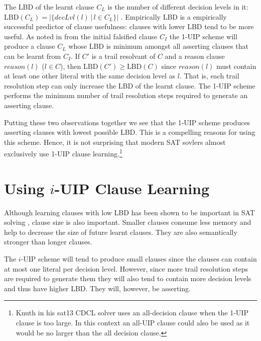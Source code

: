 \documentclass[runningheads]{llncs}
\newcommand{\sat}{SAT\xspace}
\newcommand{\LBD}{\text{LBD}}
\newcommand{\dlevel}[1]{\ensuremath{\mathit{decLvl}(#1)}}
\newcommand{\reason}[1]{\ensuremath{\mathit{reason}(#1)}}
\begin{document}
The LBD of the learnt clause $C_L$ is the number of different decision
levels in it:
$\LBD(C_L)=\left|\big\{\dlevel{l}\,|\,l \in C_L\big\}\right|$
\cite{DBLP:conf/ijcai/AudemardS09}. Empirically LBD is a empirically
successful predictor of clause usefulness: clauses with lower LBD tend
to be more useful. As noted in \cite{DBLP:conf/ijcai/AudemardS09} from
the initial falsified clause $C_I$ the 1-UIP scheme will produce a
clause $C_L$ whose LBD is minimum amongst all asserting clauses that
can be learnt from $C_I$. If $C'$ is a trail resolvant of $C$ and a
reason clause $\reason{l}$ ($l\in C$), then $\LBD(C') \geq \LBD(C)$
since $\reason{l}$ must contain at least one other literal with the
same decision level as $l$. That is, each trail resolution step can
only increase the LBD of the learnt clause. The 1-UIP scheme performs
the minimum number of trail resolution steps required to generate an
asserting clause.

Putting these two observations together we see that the 1-UIP scheme
produces asserting clauses with lowest possible LBD. This is a
compelling reasons for using this scheme. Hence, it is not surprising
that modern \sat sovlers almost exclusively use 1-UIP clause
learning.\footnote{Knuth in his sat13 CDCL solver \cite{Knuth:Sat13}
  uses an all-decision clause when the 1-UIP clause is too large. In
  this context an all-UIP clause could also be used as it would be no
  larger than the all decision clause.}


\section{Using $i$-UIP Clause Learning}
\label{sec:i-uip}
Although learning clauses with low LBD has been shown to be important
in \sat solving \cite{DBLP:conf/ijcai/AudemardS09}, clause size is
also important. Smaller clauses consume less memory and help to
decrease the size of future learnt clauses. They are also semantically
stronger than longer clauses.

The $i$-UIP scheme will tend to produce small clauses since the
clauses can contain at most one literal per decision level. However,
since more trail resolution steps are required to generate them they
will also tend to contain more decision levels and thus have higher
LBD. They will, however, be asserting.
\end{document}
